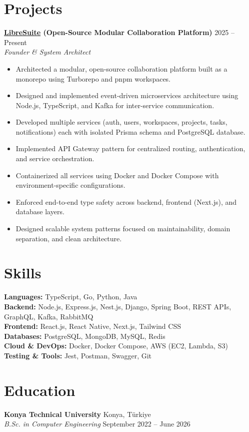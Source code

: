 \documentclass[10pt,a4paper]{extarticle}
\begin{document}
\section{Projects}
\textbf{\href{https://github.com/libresuite}{LibreSuite} (Open-Source Modular Collaboration Platform)} \hfill 2025 -- Present\\
\textit{Founder \& System Architect}
\begin{itemize}[leftmargin=*,noitemsep,topsep=0pt]
    \item Architected a modular, open-source collaboration platform built as a monorepo using Turborepo and pnpm workspaces.
    \item Designed and implemented event-driven microservices architecture using Node.js, TypeScript, and Kafka for inter-service communication.
    \item Developed multiple services (auth, users, workspaces, projects, tasks, notifications) each with isolated Prisma schema and PostgreSQL database.
    \item Implemented API Gateway pattern for centralized routing, authentication, and service orchestration.
    \item Containerized all services using Docker and Docker Compose with environment-specific configurations.
    \item Enforced end-to-end type safety across backend, frontend (Next.js), and database layers.
    \item Designed scalable system patterns focused on maintainability, domain separation, and clean architecture.
\end{itemize}
\section{Skills}
\textbf{Languages:} TypeScript, Go, Python, Java \\
\textbf{Backend:} Node.js, Express.js, Nest.js, Django, Spring Boot, REST APIs, GraphQL, Kafka, RabbitMQ \\
\textbf{Frontend:} React.js, React Native, Next.js, Tailwind CSS \\
\textbf{Databases:} PostgreSQL, MongoDB, MySQL, Redis \\
\textbf{Cloud \& DevOps:} Docker, Docker Compose, AWS (EC2, Lambda, S3) \\
\textbf{Testing \& Tools:} Jest, Postman, Swagger, Git
\section{Education}
\textbf{Konya Technical University} \hfill Konya, Türkiye\\
\textit{B.Sc. in Computer Engineering} \hfill September 2022 -- June 2026\\
\end{document}
